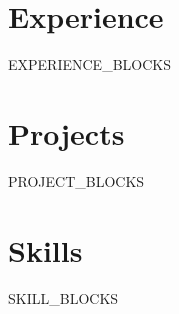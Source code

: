 \documentclass[11pt]{article}
\begin{document}
\section*{Experience}
{{EXPERIENCE_BLOCKS}}

\section*{Projects}
{{PROJECT_BLOCKS}}

\section*{Skills}
{{SKILL_BLOCKS}}
\end{document}
